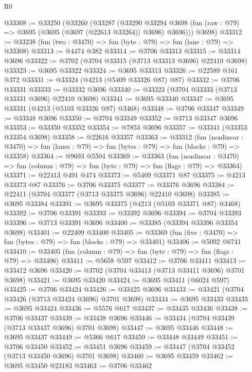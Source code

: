 \begin{lexlean}{R0}
\begin{coremodule}
@33308 := @33250
    (@33260
      (@33287
        (@33290
          @33294
          @3698
          (fun (raw : @79) => @3695 (@3695 (@3697 (@22613 @33264)) @3696) @3696)))
      @3698)
@33312 := @33238 (fun (two : @3470) => fun (byte : @79) => fun (lane : @79) => @33308)
@33313 := @4474 @382
@33314 := @3706 @33313
@33315 := @33314 @3696
@33322 := @3702 (@3704 @33315 (@3713 @33313 @3696) @22410 @3698)
@33323 := @3695 @33322
@33324 := @3695 @33313
@33326 := @22589 @161 @372
@33331 := @33324 (@4213 (@5409 @33326 @87) @87)
@33332 := @3706 @33331
@33333 := @33332 @3696
@33340 := @33323 (@3704 @33333 (@3713 @33331 @3696) @22410 @3698)
@33341 := @3695 @33340
@33347 := @3695 @33331 (@4213 (@5103 @33326 @87) @3468)
@33348 := @3706 @33347
@33349 := @33348 @3696
@33350 := @3704 @33349
@33352 := @3713 @33347 @3696
@33353 := @33350 @33352
@33354 := @7853 @3696
@33357 := @33341 (@33353 @33354 @3698)
@33358 := @22616 @33357
@33363 := @33312
    (fun (nonlinear : @3470) =>
    fun (lanes : @79) => fun (bytes : @79) => fun (blocks : @79) => @33358)
@33364 := @9693 @5504
@33369 := @33363
    (fun (nonlinear : @3470) =>
    fun (column : @79) => fun (byte : @79) => fun (flags : @79) => @33364)
@33371 := @22413 @491 @474
@33373 := @5409 @33371 @87
@33375 := @4213 @33373 @87
@33376 := @3706 @33375
@33377 := @33376 @3696
@33384 := @22411 (@3704 @33377 (@3713 @33375 @3696) @22410 @3698)
@33385 := @3695 @33384
@33391 := @3695 @33375 (@4213 (@5103 @33371 @87) @3468)
@33392 := @3706 @33391
@33393 := @33392 @3696
@33394 := @3704 @33393
@33396 := @3713 @33391 @3696
@33400 := @33385 (@33394 @33396 @33354 @3698)
@33401 := @22409 @33400
@33405 := @33369 (fun (five : @3470) => fun (bytes : @79) => fun (blocks : @79) => @33401)
@33406 := @5092 @6741
@33410 := @33405 (fun (column : @79) => fun (byte : @79) => fun (flags : @79) => @33406)
@33411 := @5658 @597
@33412 := @3706 @33411
@33413 := @33412 @3696
@33420 := @3702 (@3704 @33413 (@3713 @33411 @3696) @3701 @3698)
@33421 := @3695 @33420
@33424 := @3695 @33411 (@6024 @597)
@33425 := @3706 @33424
@33426 := @33425 @3696
@33433 := @33421 (@3704 @33426 (@3713 @33424 @3696) @3701 @3698)
@33434 := @3695 @33433
@33435 := @3695 @33424
@33436 := @5576 @617
@33437 := @33435 @33436
@33438 := @3706 @33437
@33439 := @33438 @3696
@33446 := @33434 (@3704 @33439 (@3713 @33437 @3696) @3701 @3698)
@33447 := @3695 @33446
@33448 := @3695 @33437
@33449 := @5366 @617
@33450 := @33448 @33449
@33451 := @3706 @33450
@33452 := @33451 @3696
@33459 := @33447 (@3704 @33452 (@3713 @33450 @3696) @3701 @3698)
@33460 := @3695 @33459
@33462 := @3695 @33450 @23183
@33463 := @3706 @33462

\end{coremodule}
\end{lexlean}
